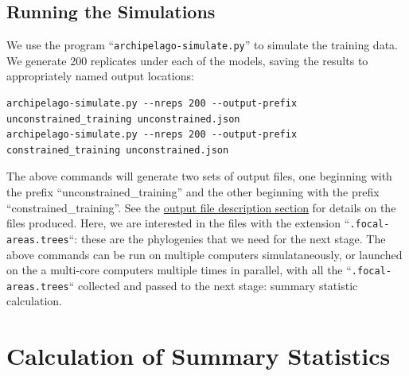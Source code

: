 \documentclass[11pt,openany]{memoir} %
\begin{document}


\subsection{Running the Simulations}
We use the program ``\texttt{archipelago-simulate.py}'' to simulate the training data.
We generate 200 replicates under each of the models, saving the results to appropriately named output locations:
\begin{lstlisting}
archipelago-simulate.py --nreps 200 --output-prefix unconstrained_training unconstrained.json
archipelago-simulate.py --nreps 200 --output-prefix constrained_training unconstrained.json
\end{lstlisting}
The above commands will generate two sets of output files, one beginning with the prefix ``unconstrained\_training'' and the other beginning with the prefix ``constrained\_training''.
See the \hyperref[sec:description-of-output-files]{output file description section} for details on the files produced.
Here, we are interested in the files with the extension ``\texttt{.focal-areas.trees}``: these are the phylogenies that we need for the next stage.
The above commands can be run on multiple computers simulataneously, or launched on the a multi-core computers multiple times in parallel, with all the ``\texttt{.focal-areas.trees}`` collected and passed to the next stage: summary statistic calculation.

\section{Calculation of Summary Statistics}
\end{document}
